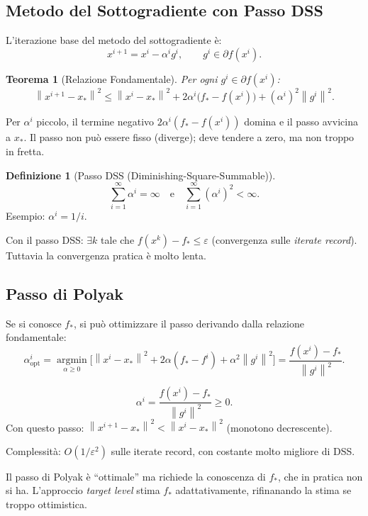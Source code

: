 \documentclass[11pt,a4paper]{article}
\theoremstyle{definition}
\newtheorem{definition}{Definizione}[section]
\theoremstyle{plain}
\newtheorem{theorem}{Teorema}[section]
\theoremstyle{remark}
\newcommand{\norm}[1]{\left\| #1 \right\|}
\newcommand{\subgr}{\partial}
\newcommand{\argmin}{\operatorname*{argmin}}
\begin{document}
\subsection{Metodo del Sottogradiente con Passo DSS}

L'iterazione base del metodo del sottogradiente è:
\[
  x^{i+1} = x^i - \alpha^i g^i, \qquad g^i \in \subgr f(x^i).
\]

\begin{theorem}[Relazione Fondamentale]
  Per ogni $g^i \in \subgr f(x^i)$:
  \[
    \norm{x^{i+1} - x_*}^2
    \leq \norm{x^i - x_*}^2 + 2\alpha^i\bigl(f_* - f(x^i)\bigr) + (\alpha^i)^2\norm{g^i}^2.
  \]
\end{theorem}

Per $\alpha^i$ piccolo, il termine negativo $2\alpha^i(f_* - f(x^i))$ domina e il passo avvicina a $x_*$.
Il passo non può essere fisso (diverge); deve tendere a zero, ma non troppo in fretta.

\begin{definition}[Passo DSS (Diminishing-Square-Summable)]
  \[
    \sum_{i=1}^\infty \alpha^i = \infty \quad \text{e} \quad
    \sum_{i=1}^\infty (\alpha^i)^2 < \infty.
  \]
  Esempio: $\alpha^i = 1/i$.
\end{definition}

Con il passo DSS: $\exists k$ tale che $f(x^k) - f_* \leq \varepsilon$ (convergenza sulle \emph{iterate record}).
Tuttavia la convergenza pratica è molto lenta.

\subsection{Passo di Polyak}

Se si conosce $f_*$, si può ottimizzare il passo derivando dalla relazione fondamentale:
\[
  \alpha^i_{\text{opt}} = \argmin_{\alpha \geq 0}
    \bigl[\norm{x^i - x_*}^2 + 2\alpha(f_* - f^i) + \alpha^2\norm{g^i}^2\bigr]
  = \frac{f(x^i) - f_*}{\norm{g^i}^2}.
\]

\begin{keybox}
  \[
    \alpha^i = \frac{f(x^i) - f_*}{\norm{g^i}^2} \geq 0.
  \]
  Con questo passo: $\norm{x^{i+1} - x_*}^2 < \norm{x^i - x_*}^2$ (monotono decrescente).

  Complessità: $O(1/\varepsilon^2)$ sulle iterate record, con costante molto migliore di DSS.
\end{keybox}

\begin{intubox}
  Il passo di Polyak è ``ottimale'' ma richiede la conoscenza di $f_*$, che in pratica non si ha.
  L'approccio \emph{target level} stima $f_*$ adattativamente, rifinanando la stima se troppo
  ottimistica.
\end{intubox}
\end{document}

